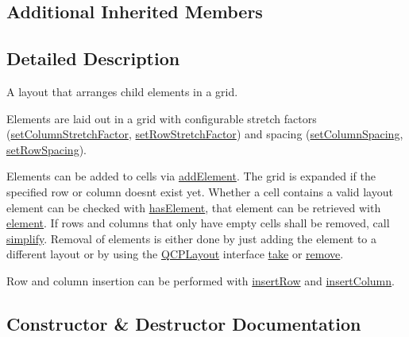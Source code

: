 \subsection*{Additional Inherited Members}


\subsection{Detailed Description}
A layout that arranges child elements in a grid. 

Elements are laid out in a grid with configurable stretch factors (\mbox{\hyperlink{class_q_c_p_layout_grid_ae38f31a71687b9d7ee3104852528fb50}{set\+Column\+Stretch\+Factor}}, \mbox{\hyperlink{class_q_c_p_layout_grid_a7b0273de5369bd93d942edbaf5b166ec}{set\+Row\+Stretch\+Factor}}) and spacing (\mbox{\hyperlink{class_q_c_p_layout_grid_a3a49272aba32bb0fddc3bb2a45a3dba0}{set\+Column\+Spacing}}, \mbox{\hyperlink{class_q_c_p_layout_grid_aaef2cd2d456197ee06a208793678e436}{set\+Row\+Spacing}}).

Elements can be added to cells via \mbox{\hyperlink{class_q_c_p_layout_grid_adff1a2ca691ed83d2d24a4cd1fe17012}{add\+Element}}. The grid is expanded if the specified row or column doesn\textquotesingle{}t exist yet. Whether a cell contains a valid layout element can be checked with \mbox{\hyperlink{class_q_c_p_layout_grid_ab0cf4f7edc9414a3bfaddac0f46dc0a0}{has\+Element}}, that element can be retrieved with \mbox{\hyperlink{class_q_c_p_layout_grid_a602b426609b4411cf6a93c3ddf3a381a}{element}}. If rows and columns that only have empty cells shall be removed, call \mbox{\hyperlink{class_q_c_p_layout_grid_a08bba60e4acd20165526a8fd7f986b58}{simplify}}. Removal of elements is either done by just adding the element to a different layout or by using the \mbox{\hyperlink{class_q_c_p_layout}{Q\+C\+P\+Layout}} interface \mbox{\hyperlink{class_q_c_p_layout_grid_a666a9fe9e92054436f9b66eba25cca0c}{take}} or \mbox{\hyperlink{class_q_c_p_layout_a6c58f537d8086f352576ab7c5b15d0bc}{remove}}.

Row and column insertion can be performed with \mbox{\hyperlink{class_q_c_p_layout_grid_a48af3dd7c3a653d9c3d7dd99bd02e838}{insert\+Row}} and \mbox{\hyperlink{class_q_c_p_layout_grid_a1e880a321dbe8b43b471ccd764433dc4}{insert\+Column}}. 

\subsection{Constructor \& Destructor Documentation}
\mbox{\label{class_q_c_p_layout_grid_ab2a4c1587dc8aed4c41c509c8d8d2a64}} 
